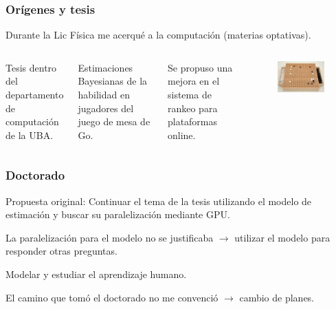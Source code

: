 \documentclass[10pt]{beamer}
\begin{document}
\begin{frame}
\frametitle{Orígenes y tesis}

 Durante la Lic Física me acerqué a la computación (materias optativas).
\begin{columns}
\vspace{0.5cm}
\pause

Tesis dentro del departamento de computación de la UBA.
\vspace{0.5cm}

Estimaciones Bayesianas de la habilidad en jugadores del juego de mesa de Go.

\vspace{0.5cm}
\pause
Se propuso una mejora en el sistema de rankeo para plataformas online.
\begin{figure}[h!]
    \centering
    \includegraphics[scale=2.]{go.jpg}
\end{figure}
\end{columns}
\end{frame}

\begin{frame}
\frametitle{Doctorado}
Propuesta original: Continuar el tema de la tesis utilizando el modelo de estimación y buscar su paralelización mediante GPU.

\pause
La paralelización para el modelo no se justificaba $\rightarrow$ utilizar el modelo para responder otras preguntas.

\pause
Modelar y estudiar el aprendizaje humano.

\pause
El camino que tomó el doctorado  no me convenció $\to$ cambio de planes.



\end{frame}
\end{document}
